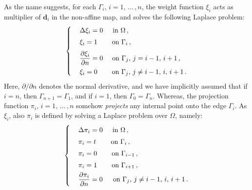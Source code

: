 \documentclass[12pt, a4paper, twoside, openright, notitlepage]{report}
\numberwithin{equation}{chapter}
\theoremstyle{theorem}
\theoremstyle{definition}
\theoremstyle{remark}
\theoremstyle{proposition}
\numberwithin{figure}{chapter}
\newcommand{\bg}[1]{\boldsymbol{#1}}
\begin{document}
		As the name suggests, for each $\Gamma_i$, $i = 1, \, \ldots \, , n$, the weight function $\xi_i$ acts as multiplier of $\bg{d}_i$ in the non-affine map, and solves the following Laplace problem:
		\begin{equation}
			\label{eq:laplace-problem-weight-function}
			\begin{cases}
				& \Delta \xi_i = 0 \hspace*{0.5cm} \text{in $\Omega$} \, , \\[0.1cm]
				& \xi_i = 1 \hspace*{0.755cm} \text{on $\Gamma_i$} \, , \\[0.2cm]
				& \dfrac{\partial \xi_i}{\partial n} = 0 \hspace*{0.475cm} \text{on $\Gamma_j$, $j = i-1, \, i+1$} \, , \\[0.2cm]
				& \xi_i = 0 \hspace*{0.755cm} \text{on $\Gamma_j$, $j \neq i-1, \, i, \, i+1$} \, .
			\end{cases}
		\end{equation}
		Here, $\partial / \partial n$ denotes the normal derivative, and we have implicitly assumed that if $i = n$, then $\Gamma_{n+1} = \Gamma_1$, and if $i = 1$, then $\Gamma_0 = \Gamma_n$. Whereas, the projection function $\pi_i$, $i = 1, \, \ldots \, , n$ somehow \emph{projects} any internal point onto the edge $\Gamma_i$. As $\xi_i$, also $\pi_i$ is defined by solving a Laplace problem over $\Omega$, namely:
		\begin{equation}
			\label{eq:laplace-problem-projection-function}
			\begin{cases}
				& \Delta \pi_i = 0 \hspace*{0.5cm} \text{in $\Omega$} \, , \\[0.1cm]
				& \pi_i = t \hspace*{0.76cm} \text{on $\Gamma_i$} \, , \\[0.1cm]
				& \pi_i = 0 \hspace*{0.755cm} \text{on $\Gamma_{i-1}$} \, , \\[0.1cm]
				& \pi_i = 1 \hspace*{0.755cm} \text{on $\Gamma_{i+1}$} \, , \\[0.1cm]
				& \dfrac{\partial \pi_i}{\partial n} = 0 \hspace*{0.53cm} \text{on $\Gamma_j$, $j \neq i-1, \, i, \, i+1$} \, .
			\end{cases}
		\end{equation}
\end{document}
